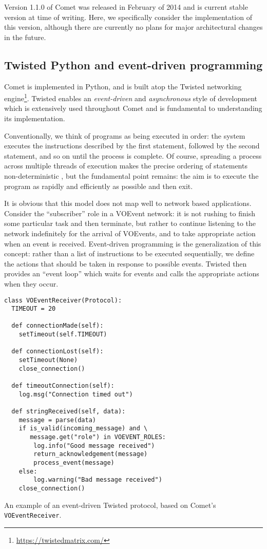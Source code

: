 \documentclass[5p,authoryear]{elsarticle}
\begin{document}
Version 1.1.0 of Comet was released in February of 2014 and is current stable
version at time of writing. Here, we specifically consider the implementation
of this version, although there are currently no plans for major architectural
changes in the future.

\subsection{Twisted Python and event-driven programming}
\label{sec:design:twisted}

Comet is implemented in Python, and is built atop the Twisted networking
engine\footnote{\url{https://twistedmatrix.com/}}. Twisted enables an
\textit{event-driven} and \textit{asynchronous} style of development which is
extensively used throughout Comet and is fundamental to understanding its
implementation.

Conventionally, we think of programs as being executed in order: the system
executes the instructions described by the first statement, followed by the
second statement, and so on until the process is complete. Of course,
spreading a process across multiple threads of execution makes the precise
ordering of statements non-deterministic \citep[and, indeed, introduces a whole
new level of complexity in the process;][]{Lee:2006}, but the fundamental
point remains: the aim is to execute the program as rapidly and efficiently as
possible and then exit.

It is obvious that this model does not map well to network based applications.
Consider the ``subscriber'' role in a VOEvent network: it is not rushing to
finish some particular task and then terminate, but rather to continue
listening to the network indefinitely for the arrival of VOEvents, and to
take appropriate action when an event is received. Event-driven programming is
the generalization of this concept: rather than a list of instructions to be
executed sequentially, we define the actions that should be taken in response
to possible events. Twisted then provides an ``event loop'' which waits for
events and calls the appropriate actions when they occur.

\begin{listing}
\begin{verbatim}
class VOEventReceiver(Protocol):
  TIMEOUT = 20

  def connectionMade(self):
    setTimeout(self.TIMEOUT)

  def connectionLost(self):
    setTimeout(None)
    close_connection()

  def timeoutConnection(self):
    log.msg("Connection timed out")

  def stringReceived(self, data):
    message = parse(data)
    if is_valid(incoming_message) and \
       message.get("role") in VOEVENT_ROLES:
        log.info("Good message received")
        return_acknowledgement(message)
        process_event(message)
    else:
        log.warning("Bad message received")
    close_connection()
\end{verbatim}
\caption{An example of an event-driven Twisted protocol, based on Comet's
\texttt{VOEventReceiver}.}
\label{lst:event}
\end{listing}
\end{document}
